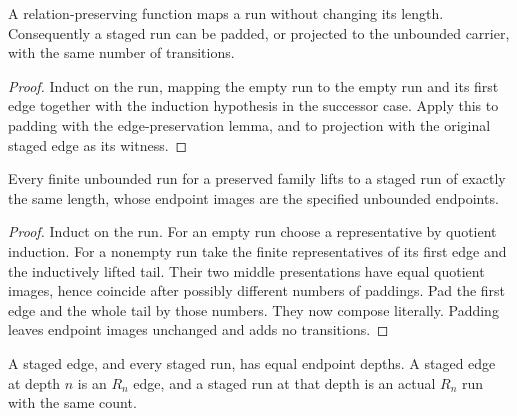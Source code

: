 

\begin{lemma}
A relation-preserving function maps a run without changing its length. Consequently a staged run can be padded, or projected to the unbounded carrier, with the same number of transitions.
\end{lemma}

\begin{proof}
Induct on the run, mapping the empty run to the empty run and its first edge together with the induction hypothesis in the successor case. Apply this to padding with the edge-preservation lemma, and to projection with the original staged edge as its witness.
\end{proof}





\begin{lemma}
Every finite unbounded run for a preserved family lifts to a staged run of exactly the same length, whose endpoint images are the specified unbounded endpoints.
\end{lemma}

\begin{proof}
Induct on the run. For an empty run choose a representative by quotient induction. For a nonempty run take the finite representatives of its first edge and the inductively lifted tail. Their two middle presentations have equal quotient images, hence coincide after possibly different numbers of paddings. Pad the first edge and the whole tail by those numbers. They now compose literally. Padding leaves endpoint images unchanged and adds no transitions.
\end{proof}



\begin{lemma}
A staged edge, and every staged run, has equal endpoint depths. A staged edge at depth $n$ is an $R_n$ edge, and a staged run at that depth is an actual $R_n$ run with the same count.
\end{lemma}

